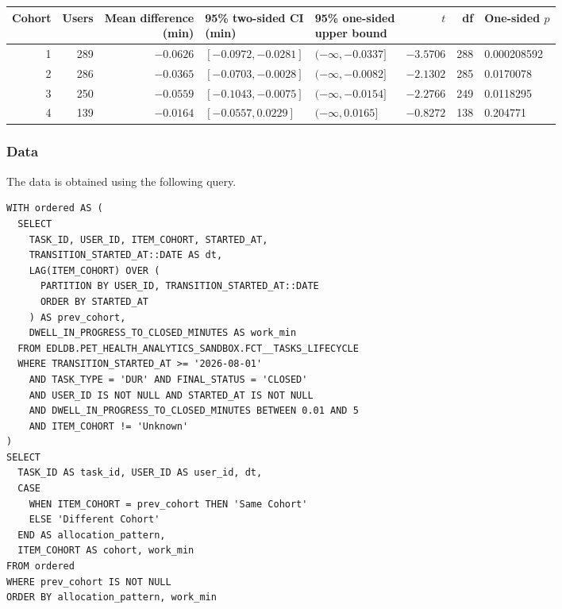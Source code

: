 \begin{center}
\begin{minipage}{\linewidth}
\centering\fontsize{8}{10}\selectfont
\begin{tabular}{@{}rrrllrrl@{}}
\toprule
Cohort & Users & \shortstack{Mean difference\\(min)} & \shortstack{95\% two-sided CI\\(min)} & \shortstack{95\% one-sided\\upper bound} & $t$ & df & One-sided $p$ \\
\midrule
1 & 289 & $-0.0626$ & $[-0.0972,-0.0281]$ & $(-\infty,-0.0337]$ & $-3.5706$ & 288 & 0.000208592 \\
2 & 286 & $-0.0365$ & $[-0.0703,-0.0028]$ & $(-\infty,-0.0082]$ & $-2.1302$ & 285 & 0.0170078 \\
3 & 250 & $-0.0559$ & $[-0.1043,-0.0075]$ & $(-\infty,-0.0154]$ & $-2.2766$ & 249 & 0.0118295 \\
4 & 139 & $-0.0164$ & $[-0.0557,0.0229]$  & $(-\infty,0.0165]$  & $-0.8272$ & 138 & 0.204771 \\
\bottomrule
\end{tabular}
\label{tab:cohort-user-paired-test}
\end{minipage}
\end{center}

\subsubsection{Data}
The data is obtained using the following query.

\begingroup\fontsize{8}{9}\selectfont
\begin{verbatim}
WITH ordered AS (
  SELECT
    TASK_ID, USER_ID, ITEM_COHORT, STARTED_AT,
    TRANSITION_STARTED_AT::DATE AS dt,
    LAG(ITEM_COHORT) OVER (
      PARTITION BY USER_ID, TRANSITION_STARTED_AT::DATE
      ORDER BY STARTED_AT
    ) AS prev_cohort,
    DWELL_IN_PROGRESS_TO_CLOSED_MINUTES AS work_min
  FROM EDLDB.PET_HEALTH_ANALYTICS_SANDBOX.FCT__TASKS_LIFECYCLE
  WHERE TRANSITION_STARTED_AT >= '2026-08-01'
    AND TASK_TYPE = 'DUR' AND FINAL_STATUS = 'CLOSED'
    AND USER_ID IS NOT NULL AND STARTED_AT IS NOT NULL
    AND DWELL_IN_PROGRESS_TO_CLOSED_MINUTES BETWEEN 0.01 AND 5
    AND ITEM_COHORT != 'Unknown'
)
SELECT
  TASK_ID AS task_id, USER_ID AS user_id, dt,
  CASE
    WHEN ITEM_COHORT = prev_cohort THEN 'Same Cohort'
    ELSE 'Different Cohort'
  END AS allocation_pattern,
  ITEM_COHORT AS cohort, work_min
FROM ordered
WHERE prev_cohort IS NOT NULL
ORDER BY allocation_pattern, work_min
\end{verbatim}
\endgroup
